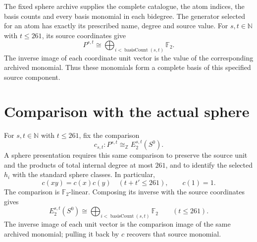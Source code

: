 \begin{definition}
The fixed sphere archive supplies the complete catalogue, the atom indices,
the basis counts and every basis monomial in each bidegree. The generator
selected for an atom has exactly its prescribed name, degree and source
value. For $s,t\in\mathbb N$ with $t\leq261$, its source coordinates give
\[
P^{s,t}\cong\bigoplus_{i<\operatorname{basisCount}(s,t)}\mathbb F_2.
\]
The inverse image of each coordinate unit vector is the value of the
corresponding archived monomial. Thus these monomials form a complete
basis of this specified source component.
\end{definition}


\section{Comparison with the actual sphere}

\begin{definition}
\label{sem:Computation:bounded-comparison}
For $s,t\in\mathbb N$ with $t\leq261$, fix the comparison
\[
c_{s,t}:P^{s,t}\cong_{\mathbb Z}E_2^{s,t}(S^0).
\]
A sphere presentation requires this same comparison to preserve the source
unit and the products of total internal degree at most $261$, and to
identify the selected $h_i$ with the standard sphere classes. In particular,
\[
c(xy)=c(x)c(y)\quad(t+t'\leq261),\qquad c(1)=1.
\]
The comparison is $\mathbb F_2$-linear. Composing its inverse with the source
coordinates gives
\[
E_2^{s,t}(S^0)\cong\bigoplus_{i<\operatorname{basisCount}(s,t)}\mathbb F_2
\qquad(t\leq261).
\]
The inverse image of each unit vector is the comparison image of the same
archived monomial; pulling it back by $c$ recovers that source monomial.
\end{definition}


